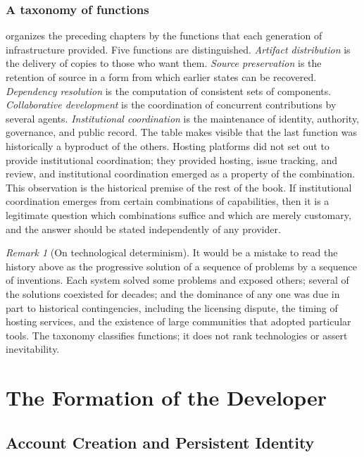 \documentclass[11pt,twoside,openright]{book}
\theoremstyle{plain}
\theoremstyle{definition}
\theoremstyle{remark}
\newtheorem{remark}[theorem]{Remark}
\begin{document}
\section{A taxonomy of functions}

 organizes the preceding chapters by the functions that each generation of infrastructure provided. Five functions are distinguished. \emph{Artifact distribution} is the delivery of copies to those who want them. \emph{Source preservation} is the retention of source in a form from which earlier states can be recovered. \emph{Dependency resolution} is the computation of consistent sets of components. \emph{Collaborative development} is the coordination of concurrent contributions by several agents. \emph{Institutional coordination} is the maintenance of identity, authority, governance, and public record. The table makes visible that the last function was historically a byproduct of the others. Hosting platforms did not set out to provide institutional coordination; they provided hosting, issue tracking, and review, and institutional coordination emerged as a property of the combination. This observation is the historical premise of the rest of the book. If institutional coordination emerges from certain combinations of capabilities, then it is a legitimate question which combinations suffice and which are merely customary, and the answer should be stated independently of any provider.

\begin{remark}[On technological determinism]
It would be a mistake to read the history above as the progressive solution of a sequence of problems by a sequence of inventions. Each system solved some problems and exposed others; several of the solutions coexisted for decades; and the dominance of any one was due in part to historical contingencies, including the licensing dispute, the timing of hosting services, and the existence of large communities that adopted particular tools. The taxonomy classifies functions; it does not rank technologies or assert inevitability.
\end{remark}

\part{The Formation of the Developer}\label{part:developer}

\chapter{Account Creation and Persistent Identity}\label{ch:accountsrepo}
\end{document}
